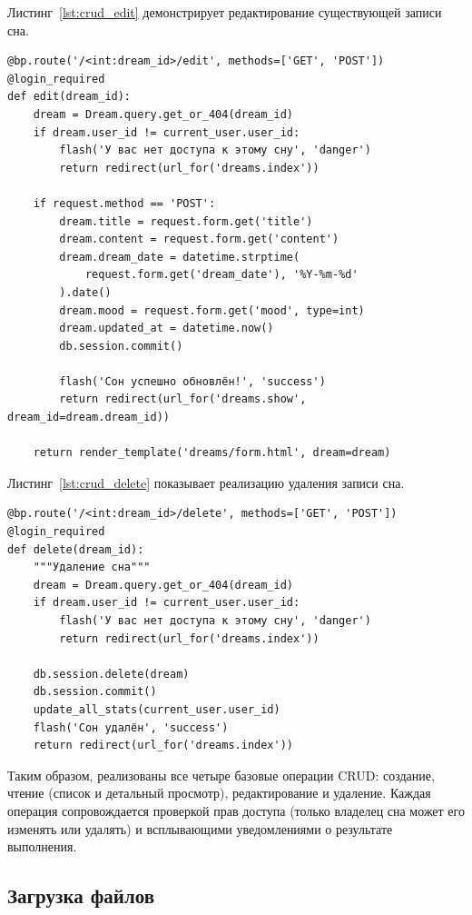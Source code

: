 \documentclass[14pt, a4paper]{extarticle}
\begin{document}
Листинг~\ref{lst:crud_edit} демонстрирует редактирование существующей записи сна.

\begin{lstlisting}[caption={Редактирование сна}, label={lst:crud_edit}]
@bp.route('/<int:dream_id>/edit', methods=['GET', 'POST'])
@login_required
def edit(dream_id):
    dream = Dream.query.get_or_404(dream_id)
    if dream.user_id != current_user.user_id:
        flash('У вас нет доступа к этому сну', 'danger')
        return redirect(url_for('dreams.index'))

    if request.method == 'POST':
        dream.title = request.form.get('title')
        dream.content = request.form.get('content')
        dream.dream_date = datetime.strptime(
            request.form.get('dream_date'), '%Y-%m-%d'
        ).date()
        dream.mood = request.form.get('mood', type=int)
        dream.updated_at = datetime.now()
        db.session.commit()
        
        flash('Сон успешно обновлён!', 'success')
        return redirect(url_for('dreams.show', dream_id=dream.dream_id))

    return render_template('dreams/form.html', dream=dream)
\end{lstlisting}


Листинг~\ref{lst:crud_delete} показывает реализацию удаления записи сна.

\begin{lstlisting}[caption={Удаление сна}, label={lst:crud_delete}]
@bp.route('/<int:dream_id>/delete', methods=['GET', 'POST'])
@login_required
def delete(dream_id):
    """Удаление сна"""
    dream = Dream.query.get_or_404(dream_id)
    if dream.user_id != current_user.user_id:
        flash('У вас нет доступа к этому сну', 'danger')
        return redirect(url_for('dreams.index'))

    db.session.delete(dream)
    db.session.commit()
    update_all_stats(current_user.user_id)
    flash('Сон удалён', 'success')
    return redirect(url_for('dreams.index'))
\end{lstlisting}

Таким образом, реализованы все четыре базовые операции CRUD: создание, чтение (список и детальный просмотр), редактирование и удаление. Каждая операция сопровождается проверкой прав доступа (только владелец сна может его изменять или удалять) и всплывающими уведомлениями о результате выполнения.
\subsection{Загрузка файлов}
\end{document}
